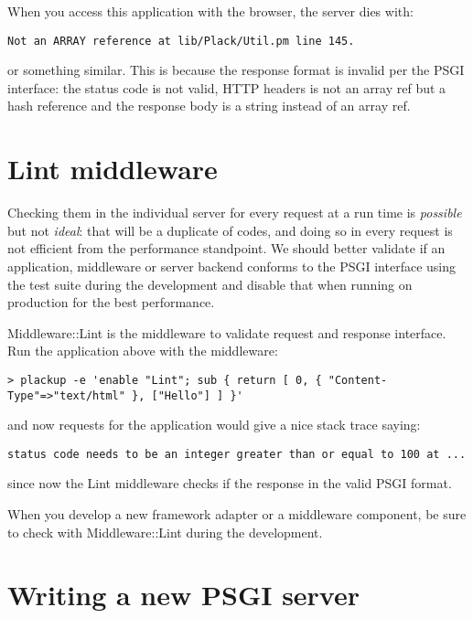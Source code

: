 When you access this application with the browser, the server dies with:

\begin{lstlisting}
Not an ARRAY reference at lib/Plack/Util.pm line 145.
\end{lstlisting}

or something similar. This is because the response format is invalid per
the PSGI interface: the status code is not valid, HTTP headers is not an
array ref but a hash reference and the response body is a string instead
of an array ref.

\section{Lint middleware}\label{lint-middleware}

Checking them in the individual server for every request at a run time
is \emph{possible} but not \emph{ideal}: that will be a duplicate of
codes, and doing so in every request is not efficient from the
performance standpoint. We should better validate if an application,
middleware or server backend conforms to the PSGI interface using the
test suite during the development and disable that when running on
production for the best performance.

Middleware::Lint is the middleware to validate request and response
interface. Run the application above with the middleware:

\begin{lstlisting}
> plackup -e 'enable "Lint"; sub { return [ 0, { "Content-Type"=>"text/html" }, ["Hello"] ] }'
\end{lstlisting}

and now requests for the application would give a nice stack trace
saying:

\begin{lstlisting}
status code needs to be an integer greater than or equal to 100 at ...
\end{lstlisting}

since now the Lint middleware checks if the response in the valid PSGI
format.

When you develop a new framework adapter or a middleware component, be
sure to check with Middleware::Lint during the development.

\section{Writing a new PSGI server}\label{writing-a-new-psgi-server}

